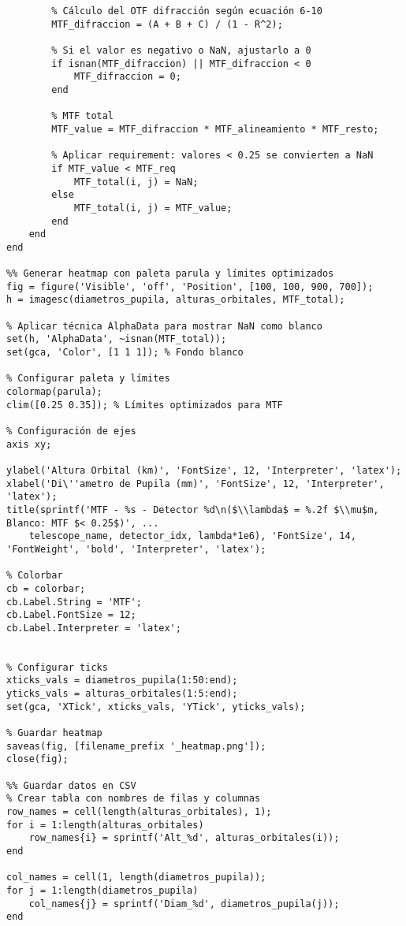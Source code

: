 \begin{verbatim}
        % Cálculo del OTF difracción según ecuación 6-10
        MTF_difraccion = (A + B + C) / (1 - R^2);
        
        % Si el valor es negativo o NaN, ajustarlo a 0
        if isnan(MTF_difraccion) || MTF_difraccion < 0
            MTF_difraccion = 0;
        end
        
        % MTF total
        MTF_value = MTF_difraccion * MTF_alineamiento * MTF_resto;
        
        % Aplicar requirement: valores < 0.25 se convierten a NaN
        if MTF_value < MTF_req
            MTF_total(i, j) = NaN;
        else
            MTF_total(i, j) = MTF_value;
        end
    end
end

%% Generar heatmap con paleta parula y límites optimizados
fig = figure('Visible', 'off', 'Position', [100, 100, 900, 700]);
h = imagesc(diametros_pupila, alturas_orbitales, MTF_total);

% Aplicar técnica AlphaData para mostrar NaN como blanco
set(h, 'AlphaData', ~isnan(MTF_total));
set(gca, 'Color', [1 1 1]); % Fondo blanco

% Configurar paleta y límites
colormap(parula);
clim([0.25 0.35]); % Límites optimizados para MTF

% Configuración de ejes
axis xy;

ylabel('Altura Orbital (km)', 'FontSize', 12, 'Interpreter', 'latex');
xlabel('Di\''ametro de Pupila (mm)', 'FontSize', 12, 'Interpreter', 'latex');
title(sprintf('MTF - %s - Detector %d\n($\\lambda$ = %.2f $\\mu$m, Blanco: MTF $< 0.25$)', ...
    telescope_name, detector_idx, lambda*1e6), 'FontSize', 14, 'FontWeight', 'bold', 'Interpreter', 'latex');

% Colorbar
cb = colorbar;
cb.Label.String = 'MTF';
cb.Label.FontSize = 12;
cb.Label.Interpreter = 'latex';


% Configurar ticks
xticks_vals = diametros_pupila(1:50:end);
yticks_vals = alturas_orbitales(1:5:end);
set(gca, 'XTick', xticks_vals, 'YTick', yticks_vals);

% Guardar heatmap
saveas(fig, [filename_prefix '_heatmap.png']);
close(fig);

%% Guardar datos en CSV
% Crear tabla con nombres de filas y columnas
row_names = cell(length(alturas_orbitales), 1);
for i = 1:length(alturas_orbitales)
    row_names{i} = sprintf('Alt_%d', alturas_orbitales(i));
end

col_names = cell(1, length(diametros_pupila));
for j = 1:length(diametros_pupila)
    col_names{j} = sprintf('Diam_%d', diametros_pupila(j));
end


\end{verbatim}
